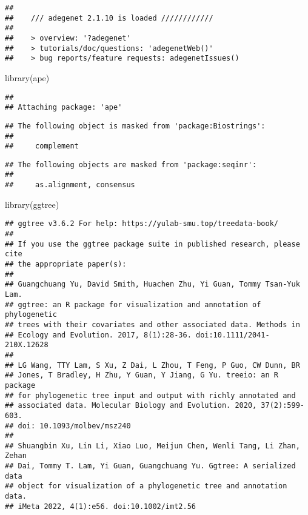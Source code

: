 \documentclass[
]{article}
\newenvironment{Shaded}{\begin{snugshade}}{\end{snugshade}}
\newcommand{\FunctionTok}[1]{\textcolor[rgb]{0.00,0.00,0.00}{#1}}
\newcommand{\NormalTok}[1]{#1}
\begin{document}
\begin{verbatim}
## 
##    /// adegenet 2.1.10 is loaded ////////////
## 
##    > overview: '?adegenet'
##    > tutorials/doc/questions: 'adegenetWeb()' 
##    > bug reports/feature requests: adegenetIssues()
\end{verbatim}

\begin{Shaded}
\begin{Highlighting}[]
\FunctionTok{library}\NormalTok{(ape)}
\end{Highlighting}
\end{Shaded}

\begin{verbatim}
## 
## Attaching package: 'ape'
\end{verbatim}

\begin{verbatim}
## The following object is masked from 'package:Biostrings':
## 
##     complement
\end{verbatim}

\begin{verbatim}
## The following objects are masked from 'package:seqinr':
## 
##     as.alignment, consensus
\end{verbatim}

\begin{Shaded}
\begin{Highlighting}[]
\FunctionTok{library}\NormalTok{(ggtree)}
\end{Highlighting}
\end{Shaded}

\begin{verbatim}
## ggtree v3.6.2 For help: https://yulab-smu.top/treedata-book/
## 
## If you use the ggtree package suite in published research, please cite
## the appropriate paper(s):
## 
## Guangchuang Yu, David Smith, Huachen Zhu, Yi Guan, Tommy Tsan-Yuk Lam.
## ggtree: an R package for visualization and annotation of phylogenetic
## trees with their covariates and other associated data. Methods in
## Ecology and Evolution. 2017, 8(1):28-36. doi:10.1111/2041-210X.12628
## 
## LG Wang, TTY Lam, S Xu, Z Dai, L Zhou, T Feng, P Guo, CW Dunn, BR
## Jones, T Bradley, H Zhu, Y Guan, Y Jiang, G Yu. treeio: an R package
## for phylogenetic tree input and output with richly annotated and
## associated data. Molecular Biology and Evolution. 2020, 37(2):599-603.
## doi: 10.1093/molbev/msz240
## 
## Shuangbin Xu, Lin Li, Xiao Luo, Meijun Chen, Wenli Tang, Li Zhan, Zehan
## Dai, Tommy T. Lam, Yi Guan, Guangchuang Yu. Ggtree: A serialized data
## object for visualization of a phylogenetic tree and annotation data.
## iMeta 2022, 4(1):e56. doi:10.1002/imt2.56
\end{verbatim}
\end{document}

